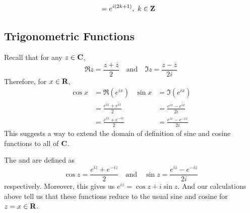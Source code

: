 \begin{example}
\begin{multicols}{2}
\begin{itemize}
\begin{align*}
&= e^{i(2k+1)},\ k \in \mathbf Z
\end{align*}
\end{itemize}
\end{multicols}
\end{example}

\bigskip

\subsection{Trigonometric Functions}
%
\begin{discussion}
Recall that for any $z \in \mathbf C$,
\[\Re z = \frac{z + \overline{z}}{2} \quad \text{and} \quad \Im z = \frac{z - \overline{z}}{2i}\]
Therefore, for $x \in \mathbf R$,
\begin{align*}
\cos x &= \Re(e^{ix}) & \sin x &= \Im(e^{ix})\\[0.5em]
 &= \frac{e^{ix} + \overline{e^{ix}}}{2} & &= \frac{e^{ix} - \overline{e^{ix}}}{2i}\\[0.5em]
 &= \frac{e^{ix} + e^{-ix}}{2} & &= \frac{e^{ix} - e^{-ix}}{2i}
\end{align*}
This suggests a way to extend the domain of definition of sine and cosine functions to all of $\mathbf C$.
\end{discussion}

\medskip

\begin{definition}
The  and  are defined as
\[\cos z = \frac{e^{iz} + e^{-iz}}{2} \quad \text{and} \quad \sin z = \frac{e^{iz} - e^{-iz}}{2i}\]
respectively. Moreover, this gives us $e^{iz} = \cos z + i\sin z$. And our calculations above tell us that these functions reduce to the usual sine and cosine for $z = x \in \mathbf R$.
\end{definition}

